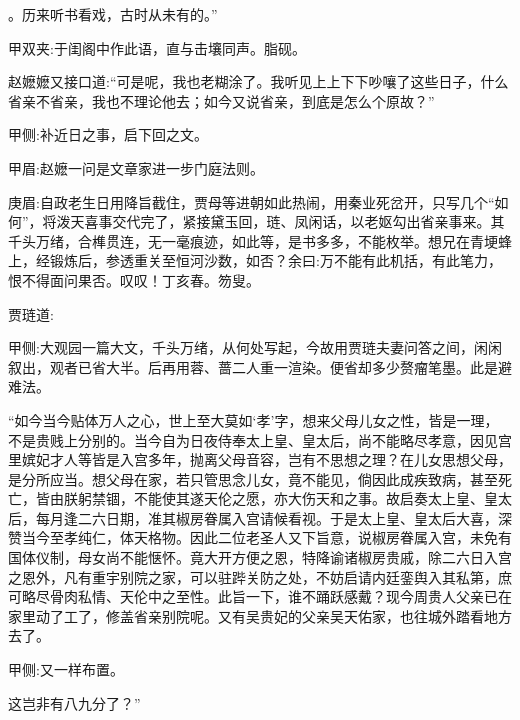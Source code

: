 \begin{parag}
。历来听书看戏，古时从未有的。”\begin{note}甲双夹:于闺阁中作此语，直与击壤同声。脂砚。\end{note}赵嬷嬷又接口道:“可是呢，我也老糊涂了。我听见上上下下吵嚷了这些日子，什么省亲不省亲，我也不理论他去；如今又说省亲，到底是怎么个原故？”\begin{note}甲侧:补近日之事，启下回之文。\end{note}\begin{note}甲眉:赵嬷一问是文章家进一步门庭法则。\end{note}\begin{note}庚眉:自政老生日用降旨截住，贾母等进朝如此热闹，用秦业死岔开，只写几个“如何”，将泼天喜事交代完了，紧接黛玉回，琏、凤闲话，以老妪勾出省亲事来。其千头万绪，合榫贯连，无一毫痕迹，如此等，是书多多，不能枚举。想兄在青埂蜂上，经锻炼后，参透重关至恒河沙数，如否？余曰:万不能有此机括，有此笔力，恨不得面问果否。叹叹！丁亥春。笏叟。\end{note}贾琏道:\begin{note}甲侧:大观园一篇大文，千头万绪，从何处写起，今故用贾琏夫妻问答之间，闲闲叙出，观者已省大半。后再用蓉、蔷二人重一渲染。便省却多少赘瘤笔墨。此是避难法。\end{note}“如今当今贴体万人之心，世上至大莫如‘孝’字，想来父母儿女之性，皆是一理，不是贵贱上分别的。当今自为日夜侍奉太上皇、皇太后，尚不能略尽孝意，因见宫里嫔妃才人等皆是入宫多年，抛离父母音容，岂有不思想之理？在儿女思想父母，是分所应当。想父母在家，若只管思念儿女，竟不能见，倘因此成疾致病，甚至死亡，皆由朕躬禁锢，不能使其遂天伦之愿，亦大伤天和之事。故启奏太上皇、皇太后，每月逢二六日期，准其椒房眷属入宫请候看视。于是太上皇、皇太后大喜，深赞当今至孝纯仁，体天格物。因此二位老圣人又下旨意，说椒房眷属入宫，未免有国体仪制，母女尚不能惬怀。竟大开方便之恩，特降谕诸椒房贵戚，除二六日入宫之恩外，凡有重宇别院之家，可以驻跸关防之处，不妨启请内廷銮舆入其私第，庶可略尽骨肉私情、天伦中之至性。此旨一下，谁不踊跃感戴？现今周贵人父亲已在家里动了工了，修盖省亲别院呢。又有吴贵妃的父亲吴天佑家，也往城外踏看地方去了。\begin{note}甲侧:又一样布置。\end{note}这岂非有八九分了？”
\end{parag}


